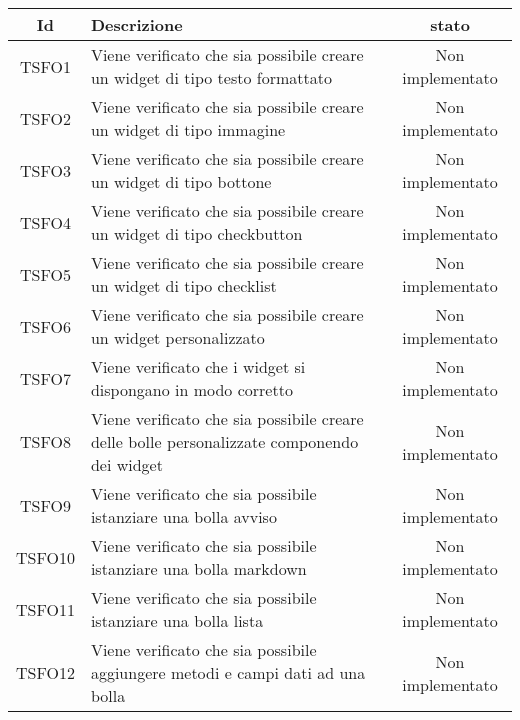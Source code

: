 \begin{center}
	\begin{longtable}{|c|>{\centering}m{7cm}|c|}\hline
		Id & Descrizione & stato \\ \hline
		TSFO1 & Viene verificato che sia possibile creare un widget di tipo testo formattato & Non implementato \\ \hline
		TSFO2 & Viene verificato che sia possibile creare un widget di tipo immagine & Non implementato \\ \hline
		TSFO3 & Viene verificato che sia possibile creare un widget di tipo bottone & Non implementato \\ \hline
		TSFO4 & Viene verificato che sia possibile creare un widget di tipo checkbutton & Non implementato \\ \hline
		TSFO5 & Viene verificato che sia possibile creare un widget di tipo checklist & Non implementato \\ \hline
		TSFO6 & Viene verificato che sia possibile creare un widget personalizzato & Non implementato \\ \hline
		TSFO7 & Viene verificato che i widget si dispongano in modo corretto & Non implementato \\ \hline
		TSFO8 & Viene verificato che sia possibile creare delle bolle personalizzate componendo dei widget & Non implementato \\ \hline
		TSFO9 & Viene verificato che sia possibile istanziare una bolla avviso & Non implementato \\ \hline
		TSFO10 & Viene verificato che sia possibile istanziare una bolla markdown & Non implementato \\ \hline
		TSFO11 & Viene verificato che sia possibile istanziare una bolla lista & Non implementato \\ \hline
		TSFO12 & Viene verificato che sia possibile aggiungere metodi e campi dati ad una bolla & Non implementato \\ \hline
	\end{longtable}
\end{center}
